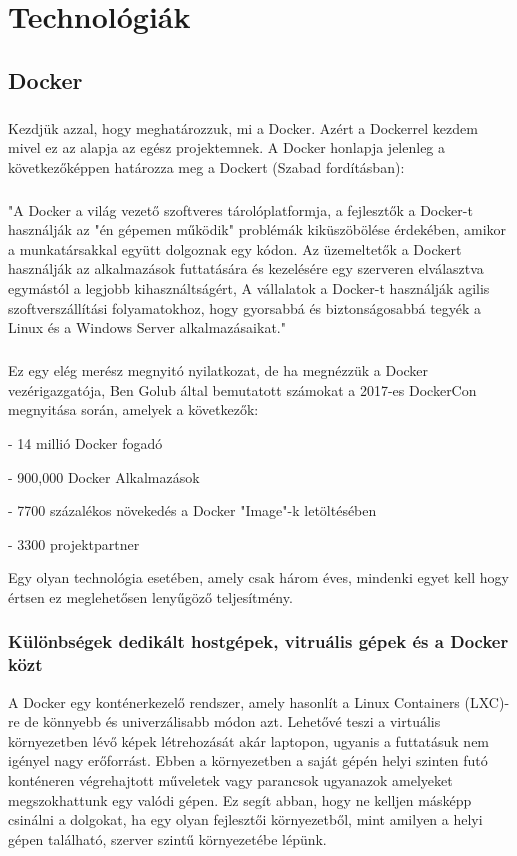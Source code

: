 \chapter{Technológiák}
\label{chapTech}

\section{Docker}
\label{docker}
\paragraph{}
Kezdjük azzal, hogy meghatározzuk, mi a Docker.
Azért a Dockerrel kezdem mivel ez az alapja az egész projektemnek.
A Docker honlapja jelenleg a következőképpen határozza meg a Dockert (Szabad fordításban):

\paragraph{}
"A Docker a világ vezető szoftveres tárolóplatformja, a fejlesztők a Docker-t használják az "én gépemen működik" problémák kiküszöbölése érdekében, amikor a munkatársakkal együtt dolgoznak egy kódon. Az üzemeltetők a Dockert használják az alkalmazások futtatására és kezelésére egy szerveren elválasztva egymástól a legjobb kihasználtságért, A vállalatok a Docker-t használják agilis szoftverszállítási folyamatokhoz, hogy gyorsabbá és biztonságosabbá tegyék a Linux és a Windows Server alkalmazásaikat." \cite{dockerswebpage}

\paragraph{}
Ez egy elég merész megnyitó nyilatkozat, de ha megnézzük a Docker vezérigazgatója, Ben Golub által bemutatott számokat a 2017-es DockerCon megnyitása során, amelyek a következők:

 - 14 millió Docker fogadó
 
 - 900,000 Docker Alkalmazások
 
 - 7700 százalékos növekedés a Docker "Image"-k letöltésében
 
 - 3300 projektpartner

Egy olyan technológia esetében, amely csak három éves, mindenki egyet kell hogy értsen ez meglehetősen lenyűgöző teljesítmény.  \cite{dockercondata2017}

\subsection{Különbségek dedikált hostgépek, vitruális gépek és a Docker közt}
\label{dockerdiff}
A Docker egy konténerkezelő rendszer, amely hasonlít a Linux Containers (LXC)-re de könnyebb és univerzálisabb módon azt.
Lehetővé teszi a virtuális környezetben lévő képek létrehozását akár laptopon, ugyanis a futtatásuk nem igényel nagy erőforrást.
Ebben a környezetben a saját gépén helyi szinten futó konténeren végrehajtott műveletek vagy parancsok ugyanazok amelyeket megszokhattunk egy valódi gépen.
Ez segít abban, hogy ne kelljen másképp csinálni a dolgokat, ha egy olyan fejlesztői környezetből, mint amilyen a helyi gépen található, szerver szintű környezetébe lépünk.


